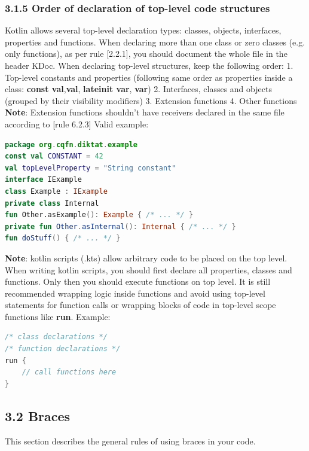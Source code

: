 \subsubsection*{\textbf{3.1.5 Order of declaration of top-level code structures}}
\leavevmode\newline
\label{sec:3.1.5}
Kotlin allows several top-level declaration types: classes, objects, interfaces, properties and functions.
When declaring more than one class or zero classes (e.g. only functions), as per rule [2.2.1], you should document the whole file in the header KDoc.
When declaring top-level structures, keep the following order:
1. Top-level constants and properties (following same order as properties inside a class: \textbf{const val},\textbf{val}, \textbf{lateinit var}, \textbf{var})
2. Interfaces, classes and objects (grouped by their visibility modifiers)
3. Extension functions
4. Other functions
\textbf{Note}:
Extension functions shouldn't have receivers declared in the same file according to [rule 6.2.3]
Valid example:
\begin{lstlisting}[language=Kotlin]
package org.cqfn.diktat.example
const val CONSTANT = 42
val topLevelProperty = "String constant"
interface IExample
class Example : IExample
private class Internal
fun Other.asExample(): Example { /* ... */ }
private fun Other.asInternal(): Internal { /* ... */ }
fun doStuff() { /* ... */ }
\end{lstlisting}
\textbf{Note}:
kotlin scripts (.kts) allow arbitrary code to be placed on the top level. When writing kotlin scripts, you should first declare all properties, classes
and functions. Only then you should execute functions on top level. It is still recommended wrapping logic inside functions and avoid using top-level statements
for function calls or wrapping blocks of code in top-level scope functions like \textbf{run}.
Example:
\begin{lstlisting}[language=Kotlin]
/* class declarations */
/* function declarations */
run {
    // call functions here
}
\end{lstlisting}
\subsection*{\textbf{3.2 Braces}}
\label{sec:3.2}
This section describes the general rules of using braces in your code.
